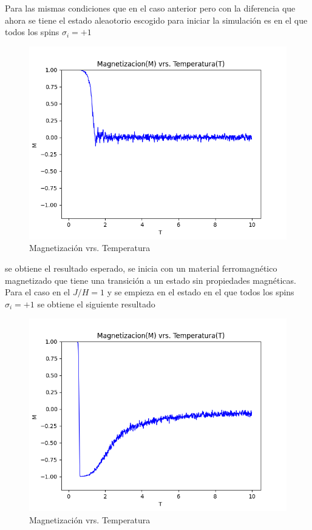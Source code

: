 \documentclass[a4paper]{article}
\begin{document}
Para las mismas condiciones que en el caso anterior pero con la diferencia que ahora se tiene el estado aleaotorio escogido para iniciar la simulación es en el que todos los spins $\sigma_i=+1$
\begin{figure}[H]
\begin{center}
\includegraphics[scale=0.6]{PlotMvT_sim2.png} 
\end{center} 
\caption{Magnetización vrs. Temperatura}
\end{figure}
se obtiene el resultado esperado, se inicia con un material ferromagnético magnetizado que tiene una transición a un estado sin propiedades magnéticas.\\
Para el caso en el $J/H=1$ y se empieza en el estado en el que todos los spins $\sigma_i=+1$ se obtiene el siguiente resultado
\begin{figure}[H]
\begin{center}
\includegraphics[scale=0.6]{PlotMvT_sim3.png} 
\end{center} 
\caption{Magnetización vrs. Temperatura}
\end{figure}
\end{document}
